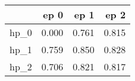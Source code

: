 \begin{tabular}{lrrr}
\toprule
{} &   ep 0 &   ep 1 &   ep 2 \\
\midrule
hp\_0 &  0.000 &  0.761 &  0.815 \\
hp\_1 &  0.759 &  0.850 &  0.828 \\
hp\_2 &  0.706 &  0.821 &  0.817 \\
\bottomrule
\end{tabular}
